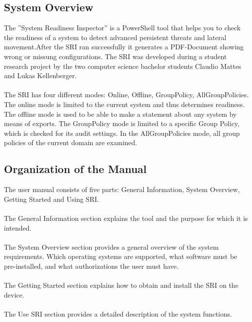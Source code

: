 
 \label{GeneralInfo}
\thispagestyle{plain}
\renewcommand\section{\stdsection}
\setcounter{section}{1}
\subsection{System Overview}
The ''System Readiness Inspector'' is a PowerShell tool that helps you to check the readiness of a system to detect advanced persistent threats and lateral movement.After the SRI ran successfully it generates a PDF-Document showing wrong or missung configurations. The SRI was developed during a student research project by the two computer science bachelor students Claudio Mattes and Lukas Kellenberger.
\\\\
The SRI has four different modes: Online, Offline, GroupPolicy, AllGroupPolicies. The online mode is limited to the current system and thus determines readiness. The offline mode is used to be able to make a statement about any system by means of exports.
The GroupPolicy mode is limited to a specific Group Policy, which is checked for its
audit settings. In the AllGroupPolicies mode, all group policies of the current domain are examined.

\subsection{Organization of the Manual}
The user manual consists of five parts: General Information, System Overview, Getting Started and Using SRI.
\\\\
The General Information section explains the tool and the purpose for which it is intended.
\\\\
The System Overview section provides a general overview of the system requirements.  Which operating systems are supported, what software must be pre-installed, and what authorizations the user must have.
\\\\
The Getting Started section explains how to obtain and install the SRI on the device. 
\\\\
The Use SRI section provides a detailed description of the system functions. 

